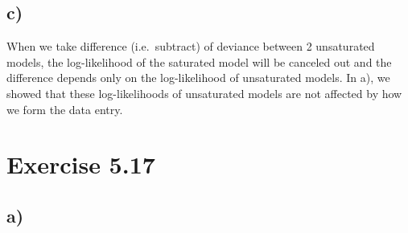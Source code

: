 \documentclass[a4paper]{article}
\begin{document}
\vspace{\baselineskip}
\subsection{c)}
When we take difference (i.e.\ subtract) of deviance between 2 unsaturated models, the log-likelihood of the saturated model will be canceled out and the difference depends only on the log-likelihood of unsaturated models. In a), we showed that these log-likelihoods of unsaturated models are not affected by how we form the data entry.


\vspace{\baselineskip}
\section{Exercise 5.17}
\subsection{a)}
\end{document}
